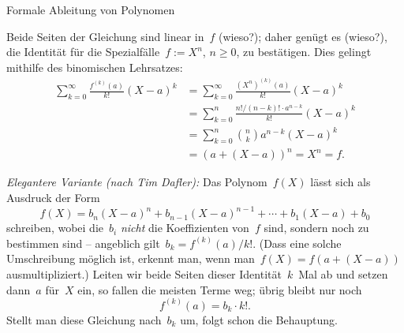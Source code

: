 \documentclass{algblatt}
\begin{document}
\begin{aufgabe}{Formale Ableitung von Polynomen}
\begin{loesungE}
\item Beide Seiten der Gleichung sind linear in~$f$ (wieso?); daher genügt es
(wieso?), die Identität für die Spezialfälle~$f := X^n$, $n \geq 0$, zu
bestätigen. Dies gelingt mithilfe des binomischen Lehrsatzes:
\begin{align*}
  \sum_{k=0}^\infty \frac{f^{(k)}(a)}{k!} (X-a)^k &=
  \sum_{k=0}^\infty \frac{(X^n)^{(k)}(a)}{k!} (X-a)^k \\
  &= \sum_{k=0}^n \frac{n! / (n-k)! \cdot a^{n-k}}{k!} (X-a)^k \\
  &= \sum_{k=0}^n \binom{n}{k} a^{n-k} (X-a)^k \\
  &= (a + (X-a))^n = X^n = f.
\end{align*}

\emph{Elegantere Variante (nach Tim Dafler):} Das Polynom~$f(X)$ lässt sich
als Ausdruck der Form
\[ f(X) = b_n (X-a)^n + b_{n-1} (X-a)^{n-1} + \cdots + b_1 (X-a) + b_0 \]
schreiben, wobei die~$b_i$ \emph{nicht} die Koeffizienten von~$f$ sind,
sondern noch zu bestimmen sind -- angeblich gilt~$b_k = f^{(k)}(a) / k!$. (Dass
eine solche Umschreibung möglich ist, erkennt man, wenn man~$f(X) = f(a+(X-a))$
ausmultipliziert.) Leiten wir beide Seiten dieser Identität~$k$~Mal ab und
setzen dann~$a$ für~$X$ ein, so fallen die meisten Terme weg; übrig bleibt nur noch
\[ f^{(k)}(a) = b_k \cdot k!. \]
Stellt man diese Gleichung nach~$b_k$ um, folgt schon die Behauptung.
\end{loesungE}
\end{aufgabe}
\end{document}
